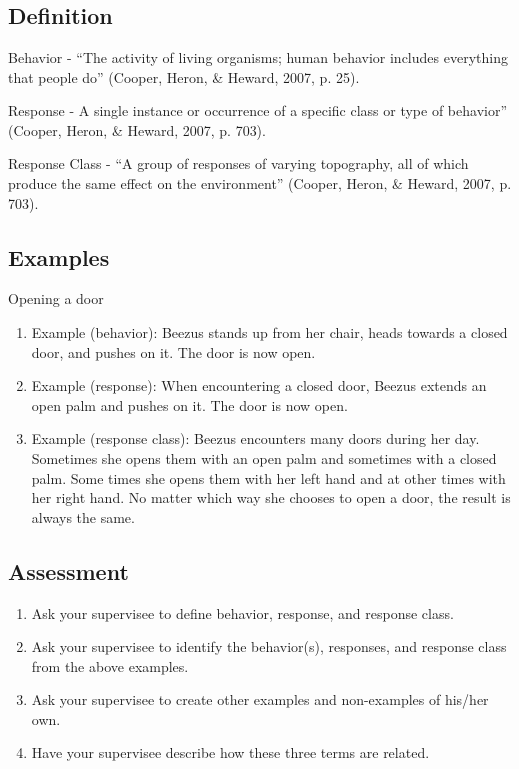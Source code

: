 \clearpage \section{\fourFKTen{}}
\subsection{Definition}  
Behavior - ``The activity of living organisms; human behavior includes everything that people do'' (Cooper, Heron, \& Heward, 2007, p. 25).

Response - A single instance or occurrence of a specific class or type of behavior'' (Cooper, Heron, \& Heward, 2007, p. 703).  

Response Class - ``A group of responses of varying topography, all of which produce the same effect on the environment'' (Cooper, Heron, \& Heward, 2007, p. 703).  
%
\subsection{Examples}
Opening a door
\begin{enumerate}
\item Example (behavior):  Beezus stands up from her chair, heads towards a closed door, and pushes on it.  The door is now open.  
\item Example (response): When encountering a closed door, Beezus extends an open palm and pushes on it.  The door is now open.   
\item Example (response class): Beezus encounters many doors during her day. Sometimes she opens them with an open palm and sometimes with a closed palm. Some times she opens them with her left hand and at other times with her right hand.  No matter which way she chooses to open a door, the result is always the same.  
%
\end{enumerate}
%
\subsection{Assessment}
\begin{enumerate}
\item Ask your supervisee to define behavior, response, and response class. 
\item Ask your supervisee to identify the behavior(s), responses, and response class from the above examples.  
\item Ask your supervisee to create other examples and non-examples of his/her own. 
\item Have your supervisee describe how these three terms are related. 
%
\end{enumerate}
%
